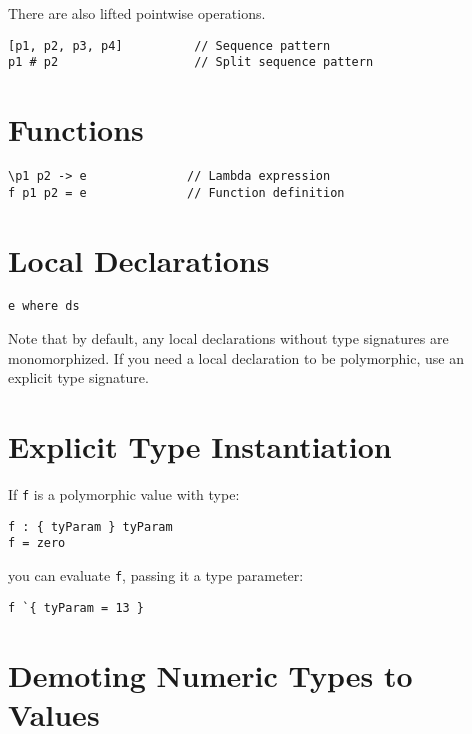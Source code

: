 There are also lifted pointwise operations.

\begin{verbatim}
[p1, p2, p3, p4]          // Sequence pattern
p1 # p2                   // Split sequence pattern
\end{verbatim}

\hypertarget{functions}{%
\section{Functions}\label{functions}}

\begin{verbatim}
\p1 p2 -> e              // Lambda expression
f p1 p2 = e              // Function definition
\end{verbatim}

\hypertarget{local-declarations}{%
\section{Local Declarations}\label{local-declarations}}

\begin{verbatim}
e where ds
\end{verbatim}

Note that by default, any local declarations without type signatures are
monomorphized. If you need a local declaration to be polymorphic, use an
explicit type signature.

\hypertarget{explicit-type-instantiation}{%
\section{Explicit Type
Instantiation}\label{explicit-type-instantiation}}

If \texttt{f} is a polymorphic value with type:

\begin{verbatim}
f : { tyParam } tyParam
f = zero
\end{verbatim}

you can evaluate \texttt{f}, passing it a type parameter:

\begin{verbatim}
f `{ tyParam = 13 }
\end{verbatim}

\hypertarget{demoting-numeric-types-to-values}{%
\section{Demoting Numeric Types to
Values}\label{demoting-numeric-types-to-values}}

